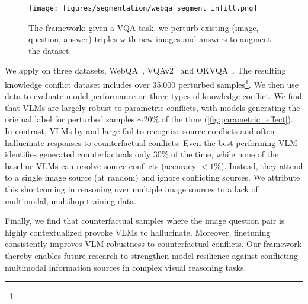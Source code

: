 \begin{figure}
    \centering
    \texttt{[image: figures/segmentation/webqa\_segment\_infill.png]}
    \vspace{-2mm}
    \caption{The \segsub framework: given a VQA task, we perturb existing (image, question, answer) triples with new images and answers to augment the dataset.}
     \vspace{-4mm}
    \label{fig:seg_sub_pipeline}
\end{figure}


We apply \segsub on three datasets, WebQA~\cite{chang_webqa_2021}, VQAv2~\cite{goyal2017making} and OKVQA~\cite{marino_ok-vqa_2019}. The resulting knowledge conflict dataset includes over 35,000 perturbed samples\footnote{\dataseturl}. 
We then use \segsub data to evaluate model performance on three types of knowledge conflict. We find that VLMs are largely robust to parametric conflicts, with models generating the original label for perturbed samples $\sim$20\% of the time (\autoref{fig:parametric_effect}). In contrast, VLMs by and large fail to recognize source conflicts and often hallucinate responses to counterfactual conflicts. Even the best-performing VLM identifies generated counterfactuals only 30\% of the time, while none of the baseline VLMs can resolve source conflicts (accuracy $<1\%$). Instead, they attend to a single image source (at random) and ignore conflicting sources. We attribute this shortcoming in reasoning over multiple image sources to a lack of multimodal, multihop training data. 

Finally, we find that counterfactual samples where the image question pair is highly contextualized provoke VLMs to hallucinate. Moreover, finetuning consistently improves VLM robustness to counterfactual conflicts. Our framework thereby enables future research to strengthen model resilience against conflicting multimodal information sources in complex visual reasoning tasks.



